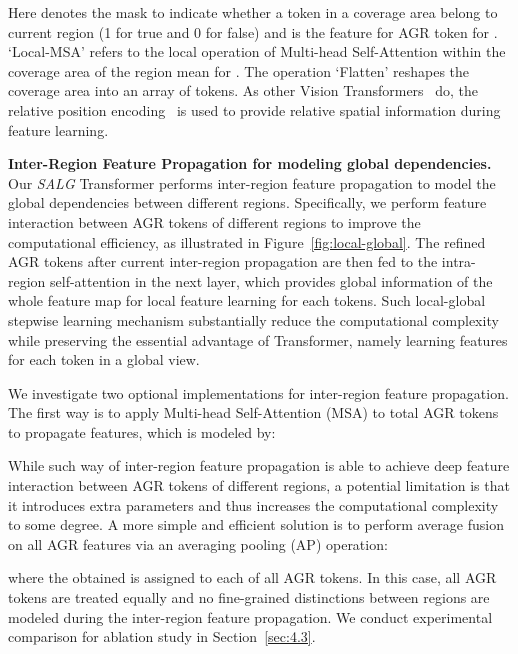 Here  denotes the mask to indicate whether a token in a coverage area belong to current region (1 for true and 0 for false) and  is the feature for AGR token for . `Local-MSA' refers to the local operation of Multi-head Self-Attention within the coverage area of the region mean for . The operation `Flatten' reshapes the coverage area  into an array of tokens. As other Vision Transformers~\cite{liu2021swin} do, the relative position encoding~\cite{shaw2018self} is used to provide relative spatial information during feature learning.

\smallskip\noindent\textbf{Inter-Region Feature Propagation for modeling global dependencies.}
Our \emph{SALG} Transformer performs inter-region feature propagation to model the global dependencies between different regions. Specifically, we perform feature interaction between AGR tokens of different regions to improve the computational efficiency, as illustrated in Figure~\ref{fig:local-global}. The refined AGR tokens after current inter-region propagation are then fed to the intra-region self-attention in the next layer, which provides global information of the whole feature map for local feature learning for each tokens. Such local-global stepwise learning mechanism substantially reduce the computational complexity while preserving the essential advantage of Transformer, namely learning features for each token in a global view.

We investigate two optional implementations for inter-region feature propagation. The first way is to apply Multi-head Self-Attention (MSA) to total  AGR tokens to propagate features, which is modeled by:

While such way of inter-region feature propagation is able to achieve deep feature interaction between AGR tokens of different regions, a potential limitation is that it introduces extra parameters and thus increases the computational complexity to some degree. A more simple and efficient solution is to perform average fusion on all AGR features via an averaging pooling (AP) operation:

where the obtained  is assigned to each of all AGR tokens. In this case, all AGR tokens are treated equally and no fine-grained distinctions between regions are modeled during the inter-region feature propagation. We conduct experimental comparison for ablation study in Section~\ref{sec:4.3}.

